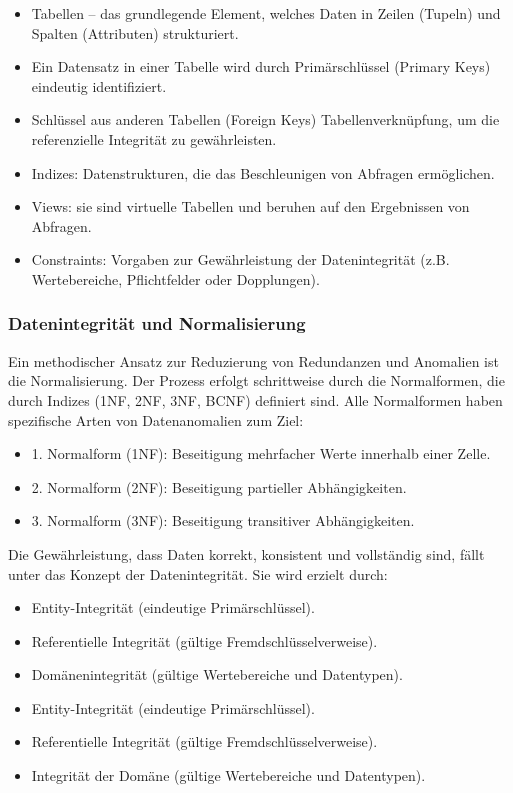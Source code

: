 \begin{itemize}
\item Tabellen – das grundlegende Element, welches Daten in Zeilen (Tupeln) und Spalten (Attributen) strukturiert.
\item Ein Datensatz in einer Tabelle wird durch Primärschlüssel (Primary Keys) eindeutig identifiziert.
\item Schlüssel aus anderen Tabellen (Foreign Keys)  Tabellenverknüpfung, um die referenzielle Integrität zu gewährleisten.
\item Indizes: Datenstrukturen, die das Beschleunigen von Abfragen ermöglichen.
\item Views: sie sind virtuelle Tabellen und beruhen auf den Ergebnissen von Abfragen.
\item Constraints: Vorgaben zur Gewährleistung der Datenintegrität (z.B. Wertebereiche, Pflichtfelder oder Dopplungen).
\end{itemize}
\subsubsection{Datenintegrität und Normalisierung}
Ein methodischer Ansatz zur Reduzierung von Redundanzen und Anomalien ist die Normalisierung.
Der Prozess erfolgt schrittweise durch die Normalformen, die durch Indizes (1NF, 2NF, 3NF, BCNF) definiert sind.
Alle Normalformen haben spezifische Arten von Datenanomalien zum Ziel: \cite*[38-41]{Gadatsch2019}

\begin{itemize}

\item 1. Normalform (1NF): Beseitigung mehrfacher Werte innerhalb einer Zelle.
\item 2. Normalform (2NF): Beseitigung partieller Abhängigkeiten.
\item 3. Normalform (3NF): Beseitigung transitiver Abhängigkeiten.

\end{itemize}

Die Gewährleistung, dass Daten korrekt, konsistent und vollständig sind,
fällt unter das Konzept der Datenintegrität.
Sie wird erzielt durch: \cite*[38-41]{Gadatsch2019}

\begin{itemize}
\item
Entity-Integrität (eindeutige Primärschlüssel).
\item
Referentielle Integrität (gültige Fremdschlüsselverweise).

\item Domänenintegrität (gültige Wertebereiche und Datentypen).
\item Entity-Integrität (eindeutige Primärschlüssel).
\item Referentielle Integrität (gültige Fremdschlüsselverweise).
\item Integrität der Domäne (gültige Wertebereiche und Datentypen).

\end{itemize}


